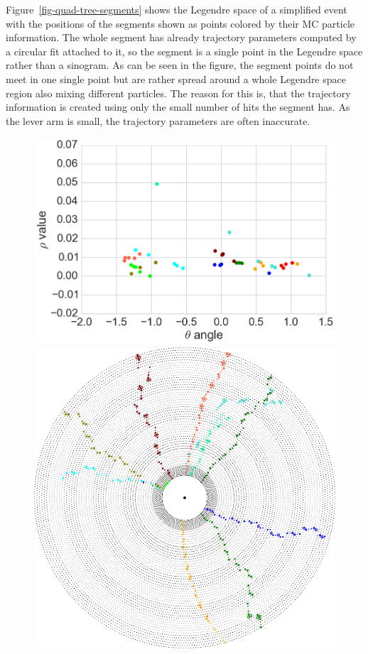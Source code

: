 Figure~\ref{fig-quad-tree-segments} shows the Legendre space of a simplified event with the positions of the segments shown as points colored by their MC particle information. The whole segment has already trajectory parameters computed by a circular fit attached to it, so the segment is a single point in the Legendre space rather than a sinogram. As can be seen in the figure, the segment points do not meet in one single point but are rather spread around a whole Legendre space region also mixing different particles. The reason for this is, that the trajectory information is created using only the small number of hits the segment has. As the lever arm is small, the trajectory parameters are often inaccurate.

\begin{figure}
  \centering
  \begin{minipage}{0.48\linewidth}
    \includegraphics[width=\linewidth]{figures/workflow/quad_tree_segments.png}
  \end{minipage}
  \begin{minipage}{0.48\linewidth}
    \includegraphics[width=\linewidth]{figures/workflow/quad_tree_segments_event.png}

\end{minipage}
\end{figure}
